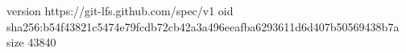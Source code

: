 version https://git-lfs.github.com/spec/v1
oid sha256:b54f43821c5474e79fcdb72cb42a3a496eeafba6293611d6d407b50569438b7a
size 43840
